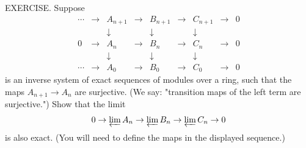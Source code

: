 EXERCISE. Suppose
$$\begin{array}{ccccccccc} \cdots&\to&A_{n+1}&\to&B_{n+1}&\to&C_{n+1}&\to&0 \\ &&\downarrow&&\downarrow&&\downarrow \\ 0&\to&A_n&\to&B_n&\to&C_n&\to&0 \\ &&\downarrow&&\downarrow&&\downarrow \\ \cdots&\to&A_0&\to&B_0&\to&C_0&\to&0 \end{array}$$
is an inverse system of exact sequences of modules over a ring, such that the maps $A_{n+1}\to A_n$ are surjective. (We say: "transition maps of the left term are surjective.") Show that the limit
$$0\to\varprojlim A_n\to\varprojlim B_n\to\varprojlim C_n\to0$$
is also exact. (You will need to define the maps in the displayed sequence.)
